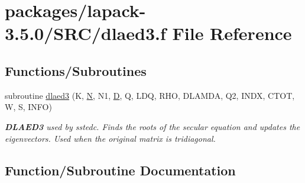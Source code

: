 \hypertarget{dlaed3_8f}{}\section{packages/lapack-\/3.5.0/\+S\+R\+C/dlaed3.f File Reference}
\label{dlaed3_8f}
\subsection*{Functions/\+Subroutines}
\begin{DoxyCompactItemize}
\item 
subroutine \hyperlink{dlaed3_8f_af999454a10e2af1e9b7b3e7ddfb73869}{dlaed3} (K, \hyperlink{polmisc_8c_a0240ac851181b84ac374872dc5434ee4}{N}, N1, \hyperlink{odrpack_8h_a7dae6ea403d00f3687f24a874e67d139}{D}, Q, L\+D\+Q, R\+H\+O, D\+L\+A\+M\+D\+A, Q2, I\+N\+D\+X, C\+T\+O\+T, W, S, I\+N\+F\+O)
\begin{DoxyCompactList}\small\item\em {\bfseries D\+L\+A\+E\+D3} used by sstedc. Finds the roots of the secular equation and updates the eigenvectors. Used when the original matrix is tridiagonal. \end{DoxyCompactList}\end{DoxyCompactItemize}


\subsection{Function/\+Subroutine Documentation}
\hypertarget{dlaed3_8f_af999454a10e2af1e9b7b3e7ddfb73869}{}
